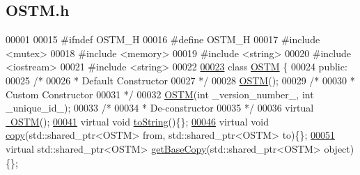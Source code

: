 \hypertarget{_o_s_t_m_8h_source}{}\subsection{O\+S\+T\+M.\+h}

\begin{DoxyCode}
00001 
00015 \textcolor{preprocessor}{#ifndef OSTM\_H}
00016 \textcolor{preprocessor}{#define OSTM\_H}
00017 \textcolor{preprocessor}{#include <mutex>}
00018 \textcolor{preprocessor}{#include <memory>}
00019 \textcolor{preprocessor}{#include <string>}
00020 \textcolor{preprocessor}{#include <iostream>}
00021 \textcolor{preprocessor}{#include <string>}
00022 
\hypertarget{_o_s_t_m_8h_source.tex_l00023}{}\hyperlink{class_o_s_t_m}{00023} \textcolor{keyword}{class }\hyperlink{class_o_s_t_m}{OSTM} \{
00024 \textcolor{keyword}{public}:
00025     \textcolor{comment}{/*}
00026 \textcolor{comment}{     * Default Constructor}
00027 \textcolor{comment}{     */}
00028     \hyperlink{class_o_s_t_m_a968edf778668bd0ec7603f0571619196_a968edf778668bd0ec7603f0571619196}{OSTM}();
00029     \textcolor{comment}{/*}
00030 \textcolor{comment}{     * Custom Constructor}
00031 \textcolor{comment}{     */}
00032     \hyperlink{class_o_s_t_m_a968edf778668bd0ec7603f0571619196_a968edf778668bd0ec7603f0571619196}{OSTM}(\textcolor{keywordtype}{int} \_version\_number\_, \textcolor{keywordtype}{int} \_unique\_id\_);
00033     \textcolor{comment}{/*}
00034 \textcolor{comment}{     * De-constructor}
00035 \textcolor{comment}{     */}
00036     \textcolor{keyword}{virtual} \hyperlink{class_o_s_t_m_a30a17d73d0259c60eeab72d6dfa9ceb1_a30a17d73d0259c60eeab72d6dfa9ceb1}{~OSTM}();
\hypertarget{_o_s_t_m_8h_source.tex_l00041}{}\hyperlink{class_o_s_t_m_a513396a115f2987fd07c203309ae8a59_a513396a115f2987fd07c203309ae8a59}{00041}     \textcolor{keyword}{virtual} \textcolor{keywordtype}{void} \hyperlink{class_o_s_t_m_a513396a115f2987fd07c203309ae8a59_a513396a115f2987fd07c203309ae8a59}{toString}()\{\};
\hypertarget{_o_s_t_m_8h_source.tex_l00046}{}\hyperlink{class_o_s_t_m_a535d90fced5adbb70312c92f3778e08d_a535d90fced5adbb70312c92f3778e08d}{00046}     \textcolor{keyword}{virtual} \textcolor{keywordtype}{void} \hyperlink{class_o_s_t_m_a535d90fced5adbb70312c92f3778e08d_a535d90fced5adbb70312c92f3778e08d}{copy}(std::shared\_ptr<OSTM> from, std::shared\_ptr<OSTM> to)\{\};  
\hypertarget{_o_s_t_m_8h_source.tex_l00051}{}\hyperlink{class_o_s_t_m_a0bfa3763bd441407dd6365f42714f94c_a0bfa3763bd441407dd6365f42714f94c}{00051}     \textcolor{keyword}{virtual} std::shared\_ptr<OSTM> \hyperlink{class_o_s_t_m_a0bfa3763bd441407dd6365f42714f94c_a0bfa3763bd441407dd6365f42714f94c}{getBaseCopy}(std::shared\_ptr<OSTM> \textcolor{keywordtype}{object})\{\};

\end{DoxyCode}

